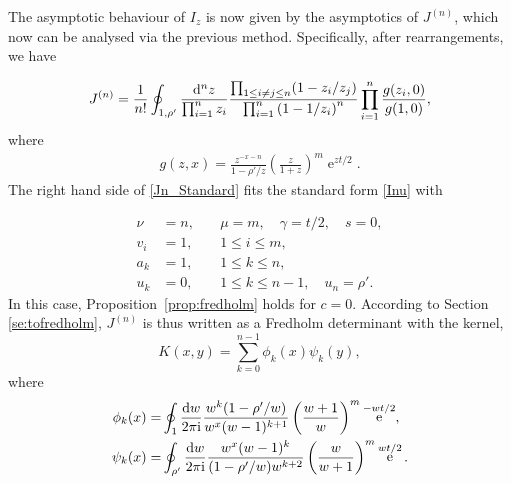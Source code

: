 \documentclass[cmp]{svjour}
\numberwithin{theorem}{section}
\numberwithin{equation}{section}
\DeclareMathOperator{\e}{e}
\def\dd{{\rm d}}
\def\ii{{\rm i}}
\begin{document}
The asymptotic behaviour of $I_z$ is now given by the asymptotics of $J^{(n)}$, which now can be analysed via the previous method. Specifically, after rearrangements, we have 

\begin{equation}
\label{Jn_Standard}
J^{(n)}
=
\frac{1}{n!}
\oint_{1,\rho'}\frac{\dd^{n}z}{\prod_{i=1}^n z_i}
\frac{\prod_{1 \leq i\neq j \leq n}(1-z_i/z_j)}
{\prod_{i=1}^{n}{(1- 1/z_i)}^n }
\prod_{i=1}^{n}
\frac{g(z_i,0)}{g(1,0)},
\end{equation}
where
\begin{align*}
g(z,x)
=\frac{z^{-x-n}}{1-\rho'/z}
\left(\frac{z}{1+z}\right)^m \e^{zt/2}.
\end{align*}
The right hand side of \eqref{Jn_Standard} fits the standard form \eqref{Inu} with

\begin{equation*}
\begin{array}{rll}
\nu &=n, \quad &\mu=m, \quad \gamma = t/2,\quad s=0, \\
v_i &=1, & 1\le i \le m, \\
a_k &=1, \quad & 1\leq k\leq n, \\
u_k &= 0 , & 1\le k\le n-1,\quad u_n =\rho'.
\end{array}
\end{equation*}
In this case, Proposition~\ref{prop:fredholm} holds for $c=0$. According to Section \ref{se:tofredholm}, $J^{(n)}$ is thus written as a Fredholm determinant with the kernel,
\begin{equation}
\label{eq:fredholm2}
K(x,y)
=
\sum_{k=0}^{n-1}
\phi_k(x)\psi_k(y),
\end{equation}
where
\begin{align*}
\phi_k(x)
=&
\oint_1 \frac{\dd w}{2 \pi \ii}
\frac{w^k(1-\rho'/w)}{w^x(w-1)^{k+1}}
\left(\frac{w+1}{w}\right)^m\e^{-wt/2},
\\
\psi_k(x)
=&
\oint_{\rho'} \frac{\dd w}{2 \pi \ii}
\frac{w^x(w-1)^{k}}{(1-\rho'/w)w^{k+2}}
\left(\frac{w}{w+1}\right)^m\e^{wt/2}.
\end{align*}
\end{document}
